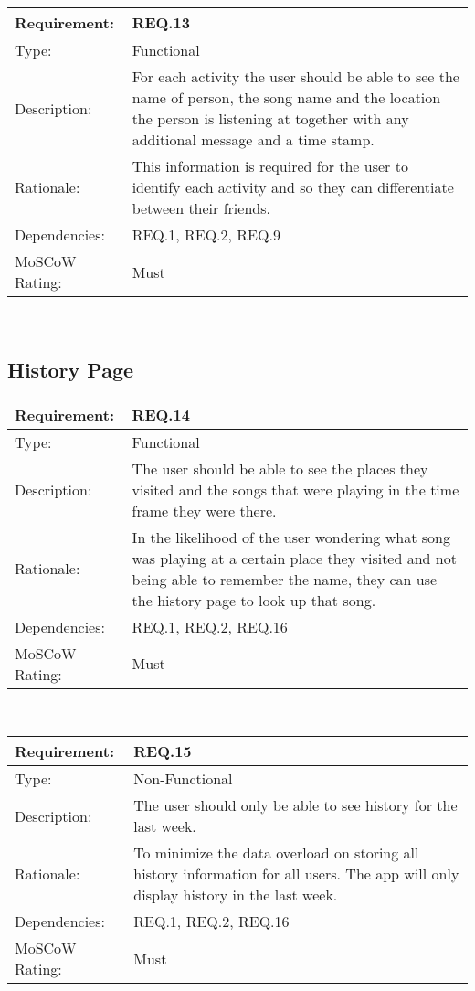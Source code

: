 \noindent
\begin{tabular}{|l || p{12.0cm}|}
  \hline
  Requirement:       & REQ.13 \\ \hline
  Type:              & Functional \\ \hline
  Description:       & For each activity the user should be able to see the name of person, the song name and the location the person is listening at together with any additional message and a time stamp.   \\ \hline
  Rationale:         & This information is required for the user to identify each activity and so they can differentiate between their friends. \\ \hline
  Dependencies:      & REQ.1, REQ.2, REQ.9 \\ \hline
  MoSCoW Rating:     & Must \\ \hline
\end{tabular}\\

\vspace{0.5cm}
\subsection*{History Page}

\noindent
\begin{tabular}{|l || p{12.0cm}|}
  \hline
  Requirement:       & REQ.14 \\ \hline
  Type:              & Functional \\ \hline
  Description:       & The user should be able to see the places they visited and the songs that were playing in the time frame they were there.  \\ \hline
  Rationale:         & In the likelihood of the user wondering what song was playing at a certain place they visited and not being able to remember the name, they can use the history page to look up that song.  \\ \hline
  Dependencies:      & REQ.1, REQ.2, REQ.16 \\ \hline
  MoSCoW Rating:     & Must \\ \hline
\end{tabular}\\

\vspace{0.5cm}

\noindent
\begin{tabular}{|l || p{12.0cm}|}
  \hline
  Requirement:       & REQ.15 \\ \hline
  Type:              & Non-Functional \\ \hline
  Description:       & The user should only be able to see history for the last week.   \\ \hline
  Rationale:         & To minimize the data overload on storing all history information for all users. The app will only display history in the last week. \\ \hline
  Dependencies:      & REQ.1, REQ.2, REQ.16 \\ \hline
  MoSCoW Rating:     & Must \\ \hline
\end{tabular}\\

